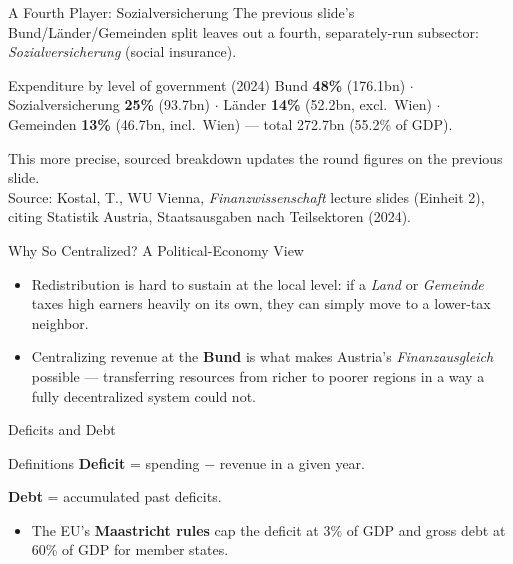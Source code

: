 \documentclass[11pt,aspectratio=169]{beamer}
\newcommand{\srcnote}[1]{{\footnotesize\color{wugray}Source: #1}}
\begin{document}
\begin{frame}{A Fourth Player: Sozialversicherung}
  \footnotesize
  The previous slide's Bund/Länder/Gemeinden split leaves out a fourth, separately-run subsector: \emph{Sozialversicherung} (social insurance).
  \vspace{0.4em}
  \begin{alertblock}{Expenditure by level of government (2024)}
    Bund \textbf{48\%} (\texteuro{}176.1bn) \(\cdot\) Sozialversicherung \textbf{25\%} (\texteuro{}93.7bn) \(\cdot\) Länder \textbf{14\%} (\texteuro{}52.2bn, excl.\ Wien) \(\cdot\) Gemeinden \textbf{13\%} (\texteuro{}46.7bn, incl.\ Wien) --- total \texteuro{}272.7bn (55.2\% of GDP).
  \end{alertblock}
  \vspace{0.3em}
  \centering
  This more precise, sourced breakdown updates the round figures on the previous slide.\\
  \srcnote{Kostal, T., WU Vienna, \emph{Finanzwissenschaft} lecture slides (Einheit 2), citing Statistik Austria, Staatsausgaben nach Teilsektoren (2024).}
\end{frame}

\begin{frame}{Why So Centralized? A Political-Economy View}
  \begin{itemize}
    \item Redistribution is hard to sustain at the local level: if a \emph{Land} or \emph{Gemeinde} taxes high earners heavily on its own, they can simply move to a lower-tax neighbor.
    \item Centralizing revenue at the \textbf{Bund} is what makes Austria's \emph{Finanzausgleich} possible --- transferring resources from richer to poorer regions in a way a fully decentralized system could not.

  \end{itemize}


\end{frame}

\begin{frame}{Deficits and Debt}
  \begin{block}{Definitions}
    \textbf{Deficit} = spending $-$ revenue in a given year.

       \textbf{Debt} = accumulated past deficits.
  \end{block}
  \begin{itemize}
    \item The EU's \textbf{Maastricht rules} cap the deficit at 3\% of GDP and gross debt at 60\% of GDP for member states.

  \end{itemize}

\end{frame}
\end{document}
